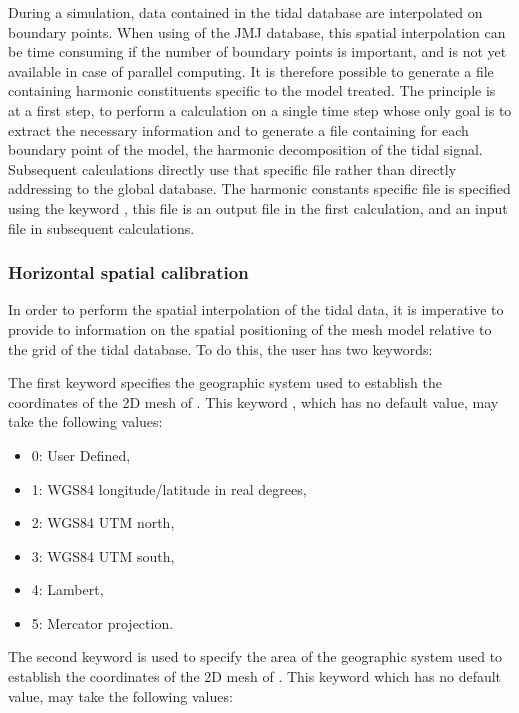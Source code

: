 During a simulation, data contained in the tidal database are interpolated on
boundary points. When using of the JMJ database, this spatial interpolation can
be time consuming if the number of boundary points is important, and is not yet
available in case of parallel computing. It is therefore possible to generate a
file containing harmonic constituents specific to the model treated. The
principle is at a first step, to perform a calculation on a single time step
whose only goal is to extract the necessary information and to generate a file
containing for each boundary point of the model, the harmonic decomposition of
the tidal signal. Subsequent calculations directly use that specific file
rather than directly addressing to the global database. The harmonic constants
specific file is specified using the keyword ,
this file is an output file in the first calculation, and an input file in
subsequent calculations.


\subsubsection{Horizontal spatial calibration}

In order to perform the spatial interpolation of the tidal data, it is
imperative to provide to  information on the spatial positioning of
the mesh model relative to the grid of the tidal database. To do this, the user
has two keywords:

The first keyword specifies the geographic system used to establish the
coordinates of the 2D mesh of . This keyword , which has no default value, may take the following values:

\begin{itemize}
\item 0: User Defined,

\item 1: WGS84 longitude/latitude in real degrees,

\item 2: WGS84 UTM north,

\item 3: WGS84 UTM south,

\item 4: Lambert,

\item 5: Mercator projection.
\end{itemize}

The second keyword is used to specify the area of the geographic system used to
establish the coordinates of the 2D mesh of . This keyword
 which has no default value, may take
the following values:

